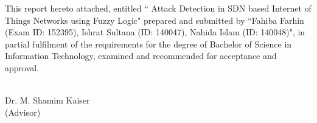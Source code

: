 This report hereto attached, entitled `` Attack Detection in SDN based Internet of Things Networks using
Fuzzy Logic" prepared and submitted by ``Fahiba Farhin (Exam ID: 152395), Ishrat Sultana (ID: 140047), Nahida Islam (ID: 140048)", in partial fulfilment of the requirements for the degree of Bachelor of Science in Information Technology, examined and recommended for acceptance and approval. 
\bigskip
\bigskip
\bigskip

 \\
   Dr. M. Shamim Kaiser \\ (Advisor)\\

